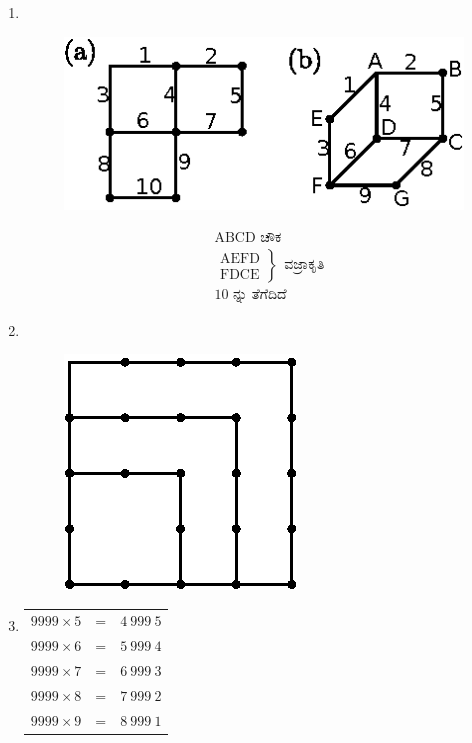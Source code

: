 \begin{enumerate}
\item
~

\begin{minipage}[c]{4cm}
\begin{figure}[H]
\centering
\includegraphics[scale=1.2]{images/chap5/ans11.eps}
\end{figure}
\end{minipage}
\qquad\qquad
\begin{minipage}[c]{4cm}
\begin{align*}
& \text{ABCD  ಚೌಕ }\\
& \left.
\begin{aligned}
\text{AEFD} \\
\text{FDCE}
\end{aligned}
\right\}
~~  \text{ವಜ್ರಾಕೃತಿ}\\
& 10 \text{ ನ್ನು ತೆಗೆದಿದೆ }
\end{align*}
\end{minipage}

\eject

\item
~
\vskip -0.8cm
\begin{figure}[H]
\centering
\includegraphics{images/chap5/ans12.eps}
\end{figure}

\item
\begin{tabular}[t]{l@{\;}l@{\;}l}
$9999 \times 5$ & = & $4~999~5$\\
$9999 \times 6$ & = & $5~999~4$\\
$9999 \times 7$ & = & $6~999~3$\\
$9999 \times 8$ & = & $7~999~2$\\
$9999 \times 9$ & = & $8~999~1$
\end{tabular}


\end{enumerate}
